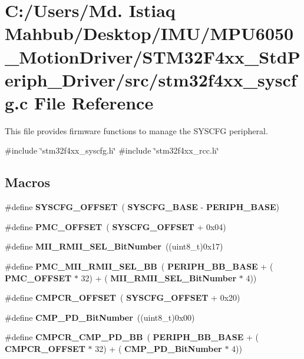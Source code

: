 \section{C\+:/\+Users/\+Md. Istiaq Mahbub/\+Desktop/\+I\+M\+U/\+M\+P\+U6050\+\_\+\+Motion\+Driver/\+S\+T\+M32\+F4xx\+\_\+\+Std\+Periph\+\_\+\+Driver/src/stm32f4xx\+\_\+syscfg.c File Reference}
\label{stm32f4xx__syscfg_8c}


This file provides firmware functions to manage the S\+Y\+S\+C\+FG peripheral.  


{\ttfamily \#include \char`\"{}stm32f4xx\+\_\+syscfg.\+h\char`\"{}}\newline
{\ttfamily \#include \char`\"{}stm32f4xx\+\_\+rcc.\+h\char`\"{}}\newline
\subsection*{Macros}
\begin{DoxyCompactItemize}
\item 
\#define \textbf{ S\+Y\+S\+C\+F\+G\+\_\+\+O\+F\+F\+S\+ET}~(\textbf{ S\+Y\+S\+C\+F\+G\+\_\+\+B\+A\+SE} -\/ \textbf{ P\+E\+R\+I\+P\+H\+\_\+\+B\+A\+SE})
\item 
\#define \textbf{ P\+M\+C\+\_\+\+O\+F\+F\+S\+ET}~(\textbf{ S\+Y\+S\+C\+F\+G\+\_\+\+O\+F\+F\+S\+ET} + 0x04)
\item 
\#define \textbf{ M\+I\+I\+\_\+\+R\+M\+I\+I\+\_\+\+S\+E\+L\+\_\+\+Bit\+Number}~((uint8\+\_\+t)0x17)
\item 
\#define \textbf{ P\+M\+C\+\_\+\+M\+I\+I\+\_\+\+R\+M\+I\+I\+\_\+\+S\+E\+L\+\_\+\+BB}~(\textbf{ P\+E\+R\+I\+P\+H\+\_\+\+B\+B\+\_\+\+B\+A\+SE} + (\textbf{ P\+M\+C\+\_\+\+O\+F\+F\+S\+ET} $\ast$ 32) + (\textbf{ M\+I\+I\+\_\+\+R\+M\+I\+I\+\_\+\+S\+E\+L\+\_\+\+Bit\+Number} $\ast$ 4))
\item 
\#define \textbf{ C\+M\+P\+C\+R\+\_\+\+O\+F\+F\+S\+ET}~(\textbf{ S\+Y\+S\+C\+F\+G\+\_\+\+O\+F\+F\+S\+ET} + 0x20)
\item 
\#define \textbf{ C\+M\+P\+\_\+\+P\+D\+\_\+\+Bit\+Number}~((uint8\+\_\+t)0x00)
\item 
\#define \textbf{ C\+M\+P\+C\+R\+\_\+\+C\+M\+P\+\_\+\+P\+D\+\_\+\+BB}~(\textbf{ P\+E\+R\+I\+P\+H\+\_\+\+B\+B\+\_\+\+B\+A\+SE} + (\textbf{ C\+M\+P\+C\+R\+\_\+\+O\+F\+F\+S\+ET} $\ast$ 32) + (\textbf{ C\+M\+P\+\_\+\+P\+D\+\_\+\+Bit\+Number} $\ast$ 4))
\end{DoxyCompactItemize}
